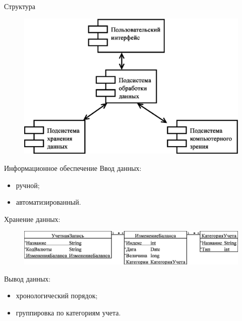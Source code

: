 \documentclass[hyperref={pdftex,unicode}]{beamer}
\begin{document}
\begin{frame}{Структура}
  \begin{figure}[h!]
    \centering
    \includegraphics[width=\textwidth]{fig/design_main.eps}
  \end{figure}
\end{frame}

\begin{frame}{Информационное обеспечение}
  Ввод данных:
  \begin{itemize}
    \item ручной;
    \item автоматизированный.
  \end{itemize}

  \smallskip
  Хранение данных:
  \begin{figure}[h!]
    \centering
    \includegraphics[width=\textwidth]{fig/design_entities.eps}
  \end{figure}

  \smallskip
  Вывод данных:
  \begin{itemize}
    \item хронологический порядок;
    \item группировка по категориям учета.
  \end{itemize}
\end{frame}
\end{document}
